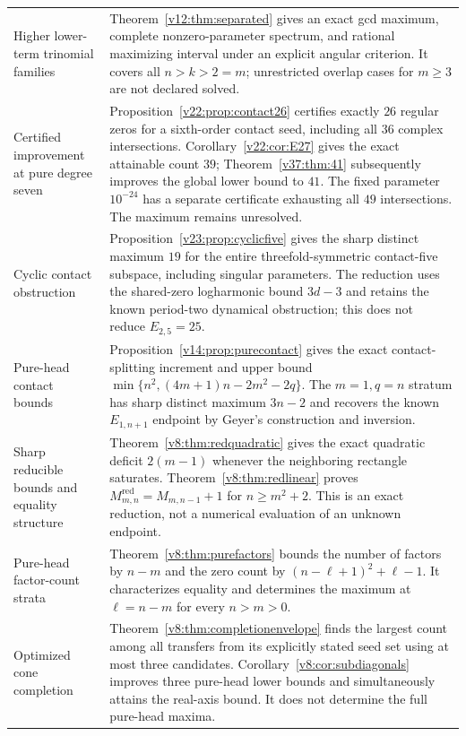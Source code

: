 \documentclass[UTF8,11pt]{ctexart}
\theoremstyle{definition}
\numberwithin{equation}{section}
\begin{document}
\begin{longtable}{@{}>{\raggedright\arraybackslash}p{}>{\raggedright\arraybackslash}p{}@{}}
Higher lower-term trinomial families & Theorem~\ref{v12:thm:separated} gives an exact gcd maximum, complete nonzero-parameter spectrum, and rational maximizing interval under an explicit angular criterion. It covers all $n>k>2=m$; unrestricted overlap cases for $m\ge3$ are not declared solved. \\
Certified improvement at pure degree seven & Proposition~\ref{v22:prop:contact26} certifies exactly $26$ regular zeros for a sixth-order contact seed, including all $36$ complex intersections. Corollary~\ref{v22:cor:E27} gives the exact attainable count $39$; Theorem~\ref{v37:thm:41} subsequently improves the global lower bound to $41$. The fixed parameter $10^{-24}$ has a separate certificate exhausting all $49$ intersections. The maximum remains unresolved. \\
Cyclic contact obstruction & Proposition~\ref{v23:prop:cyclicfive} gives the sharp distinct maximum $19$ for the entire threefold-symmetric contact-five subspace, including singular parameters. The reduction uses the shared-zero logharmonic bound $3d-3$ and retains the known period-two dynamical obstruction; this does not reduce $E_{2,5}=25$. \\
Pure-head contact bounds & Proposition~\ref{v14:prop:purecontact} gives the exact contact-splitting increment and upper bound $\min\{n^2,(4m+1)n-2m^2-2q\}$. The $m=1,q=n$ stratum has sharp distinct maximum $3n-2$ and recovers the known $E_{1,n+1}$ endpoint by Geyer's construction and inversion. \\
Sharp reducible bounds and equality structure & Theorem~\ref{v8:thm:redquadratic} gives the exact quadratic deficit $2(m-1)$ whenever the neighboring rectangle saturates. Theorem~\ref{v8:thm:redlinear} proves $M^{\mathrm{red}}_{m,n}=M_{m,n-1}+1$ for $n\ge m^2+2$. This is an exact reduction, not a numerical evaluation of an unknown endpoint. \\
Pure-head factor-count strata & Theorem~\ref{v8:thm:purefactors} bounds the number of factors by $n-m$ and the zero count by $(n-\ell+1)^2+\ell-1$. It characterizes equality and determines the maximum at $\ell=n-m$ for every $n>m>0$. \\
Optimized cone completion & Theorem~\ref{v8:thm:completionenvelope} finds the largest count among all transfers from its explicitly stated seed set using at most three candidates. Corollary~\ref{v8:cor:subdiagonals} improves three pure-head lower bounds and simultaneously attains the real-axis bound. It does not determine the full pure-head maxima. \\

\end{longtable}
\end{document}
